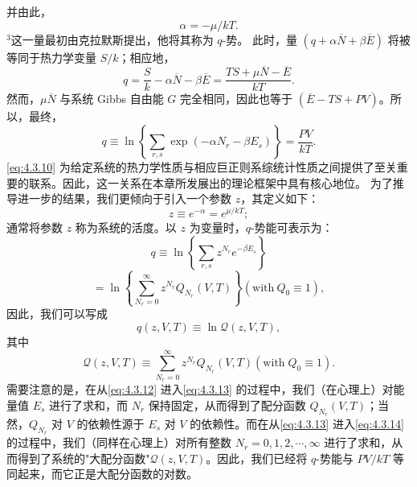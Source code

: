 并由此，
\begin{equation}\tag{4.3.8}\label{eq:4.3.8}
\alpha = - \mu / k T .
\end{equation}
\(^{3}\)这一量最初由克拉默斯提出，他将其称为 \(q\)-势。
此时，量 \((q+\alpha\overline{N}+\beta\overline{E})\) 将被等同于热力学变量 \(S/k\)；相应地，
\begin{equation}\tag{4.3.9}\label{eq:4.3.9}
q = \frac { S } { k } - \alpha \overline { { { N } } } - \beta \overline { { { E } } } = \frac { T S + \mu \overline { { { N } } } - \overline { { { E } } } } { k T } .
\end{equation}
然而，\(\mu\overline{N}\) 与系统 Gibbs 自由能 \(G\) 完全相同，因此也等于 \((\overline{E}-TS+PV)\)。所以，最终，
\begin{equation}\tag{4.3.10}\label{eq:4.3.10}
q \equiv \ln \left\{ \sum _ { r , s } \exp { ( - \alpha N _ { r } - \beta E _ { s } ) } \right\} = \frac { P V } { k T } .
\end{equation}
\autoref{eq:4.3.10} 为给定系统的热力学性质与相应巨正则系综统计性质之间提供了至关重要的联系。因此，这一关系在本章所发展出的理论框架中具有核心地位。
为了推导进一步的结果，我们更倾向于引入一个参数 \(z\)，其定义如下：
\begin{equation}\tag{4.3.11}\label{eq:4.3.11}
z \equiv e ^{- \alpha} = e ^{\mu / k T} ;
\end{equation}
通常将参数 \(z\) 称为系统的活度。以 \(z\) 为变量时，\(q\)-势能可表示为：
\begin{equation}\tag{4.3.12}\label{eq:4.3.12}
q \equiv \ln \left\{ \sum _ { r , s } z ^{N _ { r} } e ^{- \beta E _ { s} } \right\}
\end{equation}
\begin{equation}\tag{4.3.13}\label{eq:4.3.13}
= \ln \left\{ \sum _ { N _ { r } = 0 } ^{\infty} z ^{N _ { r} } Q _ { N _ { r } } ( V , T ) \right\}  ( \mathrm { w i t h ~ } Q _ { 0 } \equiv 1 ) ,
\end{equation}
因此，我们可以写成
\begin{equation}\tag{4.3.14}\label{eq:4.3.14}
q ( z , V , T ) \equiv \ln \mathcal { Q } ( z , V , T ) ,
\end{equation}
其中
\begin{equation}\tag{4.3.15}\label{eq:4.3.15}
\mathcal { Q } ( z , V , T ) \equiv \sum _ { N _ { r } = 0 } ^{\infty} z ^{N _ { r} } Q _ { N _ { r } } ( V , T )  ( \mathrm { w i t h } \; Q _ { 0 } \equiv 1 ) .
\end{equation}
需要注意的是，在从\autoref{eq:4.3.12} 进入\autoref{eq:4.3.13} 的过程中，我们（在心理上）对能量值 \(E_{s}\) 进行了求和，而 \(N_{r}\) 保持固定，从而得到了配分函数 \(Q_{N_{r}}(V,T)\)；当然，\(Q_{N_{r}}\) 对 \(V\) 的依赖性源于 \(E_{s}\) 对 \(V\) 的依赖性。而在从\autoref{eq:4.3.13} 进入\autoref{eq:4.3.14} 的过程中，我们（同样在心理上）对所有整数 \(N_{r}=0,1,2,\cdots,\infty\) 进行了求和，从而得到了系统的"大配分函数"\(\mathcal{Q}(z,V,T)\)。因此，我们已经将 \(q\)-势能与 \(PV/kT\) 等同起来，而它正是大配分函数的对数。
